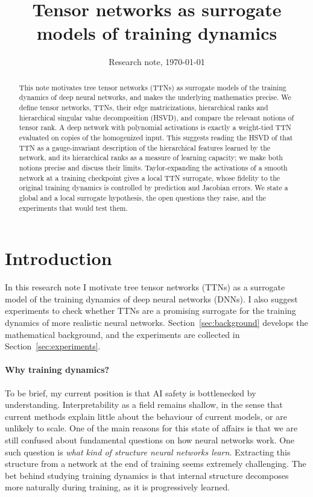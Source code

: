 \documentclass[11pt]{article}
\title{Tensor networks as surrogate models of training dynamics}
\author{}
\date{Research note, \today}
\theoremstyle{definition}
\numberwithin{equation}{section}
\begin{document}
\maketitle

\begin{abstract}
This note motivates tree tensor networks (TTNs) as surrogate models of the training dynamics of deep neural networks, and makes the underlying mathematics precise. We define tensor networks, TTNs, their edge matricizations, hierarchical ranks and hierarchical singular value decomposition (HSVD), and compare the relevant notions of tensor rank. A deep network with polynomial activations is exactly a weight-tied TTN evaluated on copies of the homogenized input. This suggests reading the HSVD of that TTN as a gauge-invariant description of the hierarchical features learned by the network, and its hierarchical ranks as a measure of learning capacity; we make both notions precise and discuss their limits. Taylor-expanding the activations of a smooth network at a training checkpoint gives a local TTN surrogate, whose fidelity to the original training dynamics is controlled by prediction and Jacobian errors. We state a global and a local surrogate hypothesis, the open questions they raise, and the experiments that would test them.
\end{abstract}

\tableofcontents

\section{Introduction}

In this research note I motivate tree tensor networks (TTNs) as a surrogate model of the training dynamics of deep neural networks (DNNs). I also suggest experiments to check whether TTNs are a promising surrogate for the training dynamics of more realistic neural networks. Section~\ref{sec:background} develops the mathematical background, and the experiments are collected in Section~\ref{sec:experiments}.

\paragraph{Why training dynamics?}
To be brief, my current position is that AI safety is bottlenecked by understanding. Interpretability as a field remains shallow, in the sense that current methods explain little about the behaviour of current models, or are unlikely to scale. One of the main reasons for this state of affairs is that we are still confused about fundamental questions on how neural networks work. One such question is \emph{what kind of structure neural networks learn}. Extracting this structure from a network at the end of training seems extremely challenging. The bet behind studying training dynamics is that internal structure decomposes more naturally during training, as it is progressively learned.
\end{document}
